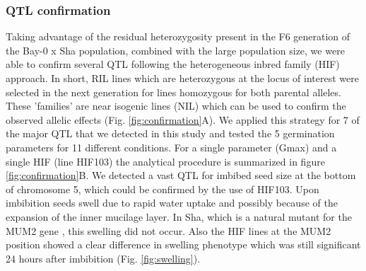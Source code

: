 \subsubsection{QTL confirmation}
Taking advantage of the residual heterozygosity present in the F6 generation of the Bay-0 x Sha population, 
combined with the large population size, we were able to confirm several QTL following the heterogeneous 
inbred family (HIF) approach. In short, RIL lines which are heterozygous at the locus of interest were 
selected in the next generation for lines homozygous for both parental alleles. These 'families' are 
near isogenic lines (NIL) which can be used to confirm the observed allelic effects (Fig. \ref{fig:confirmation}A). We 
applied this strategy for 7 of the major QTL that we detected in  this study and tested the 5 germination 
parameters for 11 different conditions. For a single parameter (Gmax) and a single HIF (line HIF103) the 
analytical procedure is summarized in figure \ref{fig:confirmation}B. We 
detected a vast QTL for imbibed seed size at the bottom of chromosome 5, which could be confirmed by the 
use of HIF103. Upon imbibition seeds swell due to rapid water uptake and possibly because of the 
expansion of the inner mucilage layer. In Sha, which is a natural mutant for the MUM2 gene 
\cite{Macquet:2007}, this swelling did not occur. Also the HIF lines at the MUM2 position showed a 
clear difference in swelling phenotype which was still significant 24 hours after imbibition (Fig. \ref{fig:swelling}).

